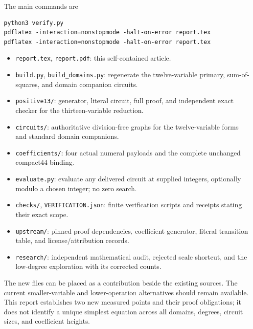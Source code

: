 \documentclass[11pt]{article}
\theoremstyle{remark}
\begin{document}
The main commands are
\begin{verbatim}
python3 verify.py
pdflatex -interaction=nonstopmode -halt-on-error report.tex
pdflatex -interaction=nonstopmode -halt-on-error report.tex
\end{verbatim}

\begin{itemize}
\item \texttt{report.tex}, \texttt{report.pdf}: this self-contained article.
\item \texttt{build.py}, \texttt{build\_domains.py}: regenerate the
twelve-variable primary, sum-of-squares, and domain companion circuits.
\item \texttt{positive13/}: generator, literal circuit, full proof, and
independent exact checker for the thirteen-variable reduction.
\item \texttt{circuits/}: authoritative division-free graphs for the
twelve-variable forms and standard domain companions.
\item \texttt{coefficients/}: four actual numeral payloads and the complete
unchanged compact44 binding.
\item \texttt{evaluate.py}: evaluate any delivered circuit at supplied
integers, optionally modulo a chosen integer; no zero search.
\item \texttt{checks/}, \texttt{VERIFICATION.json}: finite verification
scripts and receipts stating their exact scope.
\item \texttt{upstream/}: pinned proof dependencies, coefficient generator,
literal transition table, and license/attribution records.
\item \texttt{research/}: independent mathematical audit, rejected scale
shortcut, and the low-degree exploration with its corrected counts.
\end{itemize}

The new files can be placed as a contribution beside the existing sources.
The current smaller-variable and lower-operation alternatives should remain
available. This report establishes two new measured points and their proof
obligations; it does not identify a unique simplest equation across all
domains, degrees, circuit sizes, and coefficient heights.
\end{document}

